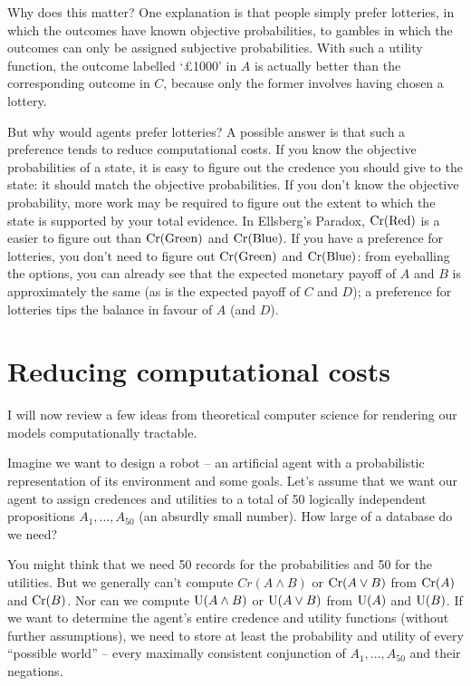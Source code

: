 Why does this matter? One explanation is that people simply prefer lotteries, in
which the outcomes have known objective probabilities, to gambles in which the
outcomes can only be assigned subjective probabilities. With such a utility
function, the outcome labelled `£1000' in $A$ is actually better than the
corresponding outcome in $C$, because only the former involves having chosen a
lottery.


But why would agents prefer lotteries? A possible answer is that such a
preference tends to reduce computational costs. If you know the objective
probabilities of a state, it is easy to figure out the credence you should give
to the state: it should match the objective probabilities. If you don't know the
objective probability, more work may be required to figure out the extent to
which the state is supported by your total evidence. In Ellsberg's Paradox,
$\text{Cr}(\text{Red})$ is a easier to figure out than $\text{Cr}(\text{Green})$ and
$\text{Cr}(\text{Blue})$. If you have a preference for lotteries, you don't need to
figure out $\text{Cr}(\text{Green})$ and $\text{Cr}(\text{Blue})$: from eyeballing the
options, you can already see that the expected monetary payoff of $A$ and $B$ is
approximately the same (as is the expected payoff of $C$ and $D$); a preference
for lotteries tips the balance in favour of $A$ (and $D$).

\section{Reducing computational costs}\label{sec:ai}

I will now review a few ideas from theoretical computer science for rendering
our models computationally tractable.

Imagine we want to design a robot -- an artificial agent with a probabilistic
representation of its environment and some goals. Let's assume that we want our
agent to assign credences and utilities to a total of 50 logically independent
propositions $A_1,\ldots,A_{50}$ (an absurdly small number). How large of a
database do we need?

You might think that we need 50 records for the probabilities and 50 for the
utilities. But we generally can't compute $Cr(A \land B)$ or $\text{Cr}(A \lor B)$
from $\text{Cr}(A)$ and $\text{Cr}(B)$. Nor can we compute $\text{U}(A \land B)$ or $\text{U}(A \lor B)$
from $\text{U}(A)$ and $\text{U}(B)$. If we want to determine the agent's entire credence
and utility functions (without further assumptions), we need to store at least
the probability and utility of every ``possible world'' -- every maximally
consistent conjunction of $A_1,\ldots,A_{50}$ and their negations.

